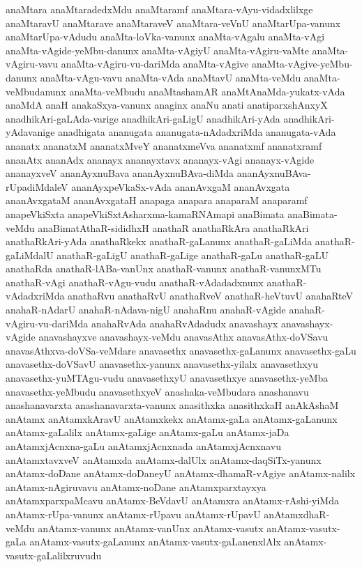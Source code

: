 {anaMtara
anaMtaradedxMdu
anaMtaramf
anaMtara-vAyu-vidadxlilxge
anaMtaravU
anaMtarave
anaMtaraveV
anaMtara-veVnU
anaMtarUpa-vanunx
anaMtarUpa-vAdudu
anaMta-loVka-vanunx
anaMta-vAgalu
anaMta-vAgi
anaMta-vAgide-yeMbu-danunx
anaMta-vAgiyU
anaMta-vAgiru-vaMte
anaMta-vAgiru-vavu
anaMta-vAgiru-vu-dariMda
anaMta-vAgive
anaMta-vAgive-yeMbu-danunx
anaMta-vAgu-vavu
anaMta-vAda
anaMtavU
anaMta-veMdu
anaMta-veMbudanunx
anaMta-veMbudu
anaMtashamAR
anaMtAnaMda-yukatx-vAda
anaMdA
anaH
anakaSxya-vanunx
anaginx
anaNu
anati
anatiparxshAnxyX
anadhikAri-gaLAda-varige
anadhikAri-gaLigU
anadhikAri-yAda
anadhikAri-yAdavanige
anadhigata
ananugata
ananugata-nAdadxriMda
ananugata-vAda
ananatx
ananatxM
ananatxMveY
ananatxmeVva
ananatxmf
ananatxramf
ananAtx
ananAdx
ananayx
ananayxtavx
ananayx-vAgi
ananayx-vAgide
ananayxveV
ananAyxnuBava
ananAyxnuBAva-diMda
ananAyxnuBAva-rUpadiMdaleV
ananAyxpeVkaSx-vAda
ananAvxgaM
ananAvxgata
ananAvxgataM
ananAvxgataH
anapaga
anapara
anaparaM
anaparamf
anapeVkiSxta
anapeVkiSxtAsharxma-kamaRNAmapi
anaBimata
anaBimata-veMdu
anaBimatAthaR-sididhxH
anathaR
anathaRkAra
anathaRkAri
anathaRkAri-yAda
anathaRkekx
anathaR-gaLanunx
anathaR-gaLiMda
anathaR-gaLiMdalU
anathaR-gaLigU
anathaR-gaLige
anathaR-gaLu
anathaR-gaLU
anathaRda
anathaR-lABa-vanUnx
anathaR-vanunx
anathaR-vanunxMTu
anathaR-vAgi
anathaR-vAgu-vudu
anathaR-vAdadadxnunx
anathaR-vAdadxriMda
anathaRvu
anathaRvU
anathaRveV
anathaR-heVtuvU
anahaRteV
anahaR-nAdarU
anahaR-nAdava-nigU
anahaRnu
anahaR-vAgide
anahaR-vAgiru-vu-dariMda
anahaRvAda
anahaRvAdadudx
anavashayx
anavashayx-vAgide
anavashayxve
anavashayx-veMdu
anavasAthx
anavasAthx-doVSavu
anavasAthxva-doVSa-veMdare
anavasethx
anavasethx-gaLanunx
anavasethx-gaLu
anavasethx-doVSavU
anavasethx-yanunx
anavasethx-yilalx
anavasethxyu
anavasethx-yuMTAgu-vudu
anavasethxyU
anavasethxye
anavasethx-yeMba
anavasethx-yeMbudu
anavasethxyeV
anashaka-veMbudara
anashanavu
anashanavarxta
anashanavarxta-vanunx
anasithxka
anasithxkaH
anAkAshaM
anAtamx
anAtamxkAravU
anAtamxkekx
anAtamx-gaLa
anAtamx-gaLanunx
anAtamx-gaLalilx
anAtamx-gaLige
anAtamx-gaLu
anAtamx-jaDa
anAtamxjAcnxna-gaLu
anAtamxjAcnxnada
anAtamxjAcnxnavu
anAtamxtavxveV
anAtamxda
anAtamx-dalUlx
anAtamx-daqSiTx-yanunx
anAtamx-doDane
anAtamx-doDaneyU
anAtamx-dhamaR-vAgiye
anAtamx-nalilx
anAtamx-nAgiruvavu
anAtamx-noDane
anAtamxparxtayxya
anAtamxparxpaMcavu
anAtamx-BeVdavU
anAtamxra
anAtamx-rAshi-yiMda
anAtamx-rUpa-vanunx
anAtamx-rUpavu
anAtamx-rUpavU
anAtamxdhaR-veMdu
anAtamx-vanunx
anAtamx-vanUnx
anAtamx-vasutx
anAtamx-vasutx-gaLa
anAtamx-vasutx-gaLanunx
anAtamx-vasutx-gaLanenxlAlx
anAtamx-vasutx-gaLalilxruvudu
}
